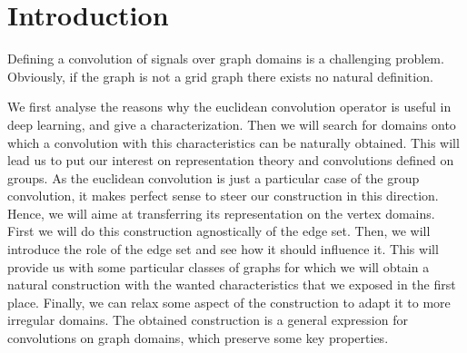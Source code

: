 \section*{Introduction}

Defining a convolution of signals over graph domains is a challenging problem. Obviously, if the graph is not a grid graph there exists no natural definition.

We first analyse the reasons why the euclidean convolution operator is useful in deep learning, and give a characterization. Then we will search for domains onto which a convolution with this characteristics can be naturally obtained. This will lead us to put our interest on representation theory and convolutions defined on groups. As the euclidean convolution is just a particular case of the group convolution, it makes perfect sense to steer our construction in this direction. Hence, we will aime at transferring its representation on the vertex domains. First we will do this construction agnostically of the edge set. Then, we will introduce the role of the edge set and see how it should influence it. This will provide us with some particular classes of graphs for which we will obtain a natural construction with the wanted characteristics that we exposed in the first place. Finally, we can relax some aspect of the construction to adapt it to more irregular domains. The obtained construction is a general expression for convolutions on graph domains, which preserve some key properties.